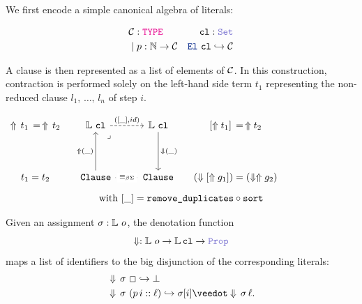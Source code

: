 We first encode a simple canonical algebra of literals:

\begin{align*}
&\cal{C} \index{$\cal{C}$} : \type & \kw{cl} \index{$\kw{cl}$}: \set  \\
&\pipe p : \N \ra \cal{C} &\el~\kw{cl} \re \cal{C}
\end{align*}

A clause is then represented as a list of elements of $\cal{C}$.
In this construction, contraction is performed solely on the left-hand side term $t_1$ representing the non-reduced clause $l_1,\, \dots,\, l_{n}$ of step $i$.

\begin{center}
\(\begin{tikzcd}[ampersand replacement=\&,column sep=small]
	{\Uparrow\,t_1 \,=\, \Uparrow\,t_2} \& \bb{L}~\kw{cl} \&\& \bb{L}~\kw{cl} \& {[\Uparrow t_1] \,=\, \Uparrow t_2} \\
	\\
	{t_1 = t_2} \& \kw{Clause} \&\& \kw{Clause} \& {(\den{[\Uparrow g_1]}) = (\den{\Uparrow g_2})}
	\arrow["({[\_], id)}", dashed, from=1-2, to=1-4]
	\arrow["\lrcorner"{anchor=center, pos=0.125}, draw=none, from=1-2, to=3-4]
	\arrow["{\Downarrow(\_)}", from=1-4, to=3-4]
	\arrow["{\Uparrow(\_)}", from=3-2, to=1-2]
	\arrow["\equivL"{description}, dotted, no head, from=3-2, to=3-4]
\end{tikzcd}\)
\[
  \text{with } [\_] = \kw{remove\_duplicates} \circ \kw{sort}
\]
\end{center}


\begin{definition}[Denotation]\label{def:denotation}
Given an assignment $\sigma : \bb{L}~o$, the denotation function
\[
  \Downarrow : \bb{L}~o \to \bb{L}\,\kw{cl} \to \prop
\]
maps a list of identifiers to the big disjunction of the corresponding literals:
\begin{align*}
&\Downarrow\,\sigma~\Box \re \bot \\
&\Downarrow\,\sigma~(p\,i :: \ell) \re \sigma[i] \veedot \Downarrow\,\sigma\,\ell.
\end{align*}
\end{definition}

